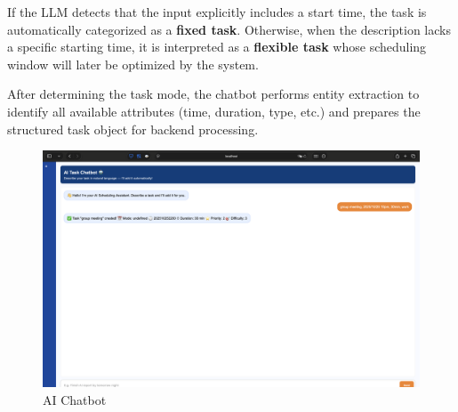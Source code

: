\documentclass[12pt, a4paper]{article}
\begin{document}
\begin{enumerate}
\begin{itemize}
                            If the LLM detects that the input explicitly includes a start time, the task is automatically categorized as a \textbf{fixed task}. Otherwise, when the description lacks a specific starting time, it is interpreted as a \textbf{flexible task} whose scheduling window will later be optimized by the system. 
                            
                            After determining the task mode, the chatbot performs entity extraction to identify all available attributes (time, duration, type, etc.) and prepares the structured task object for backend processing. 

                            \begin{figure}[H]
                                \centering
                                \includegraphics[width=\textwidth]{Images/System/chatbot/ai.png}
                                \caption{AI Chatbot}
                                \label{ai}
                            \end{figure}
        

\end{itemize}
\end{enumerate}
\end{document}
